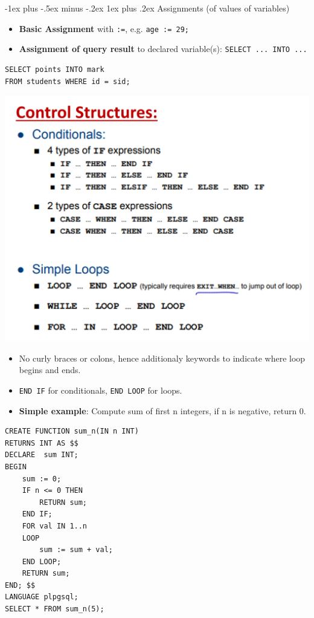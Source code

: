 \documentclass[12pt, landscape]{article}
\makeatletter
\newcommand{\code}[1]{\colorbox{gray!25!}{\lstinline|#1|}}
\renewcommand{\subsubsection}{\@startsection{subsubsection}{3}{0.1mm}%
                                {-1ex plus -.5ex minus -.2ex}%
                                {1ex plus .2ex}%
                                {\normalfont\small\bfseries}}
\makeatother
\begin{document}
\begin{multicols*}{3}
\subsubsection{Assignments (of values of variables)}
\begin{itemize}
\item \textbf{Basic Assignment} with \code{:=}, e.g. \code{age := 29;}
\item \textbf{Assignment of query result} to declared variable(s): \code{SELECT ... INTO ...}
\end{itemize}
\begin{lstlisting}
SELECT points INTO mark 
FROM students WHERE id = sid;
\end{lstlisting}

\centerline{\includegraphics[width=1 \linewidth]{controlstructures}}
\smallskip
\begin{itemize}
\item No curly braces or colons, hence additionaly keywords to indicate where loop begins and ends.
\item \code{END IF} for conditionals, \code{END LOOP} for loops.
\item \textbf{Simple example}: Compute sum of first n integers, if n is negative, return 0.
\end{itemize}

\begin{lstlisting}
CREATE FUNCTION sum_n(IN n INT)
RETURNS INT AS $$
DECLARE  sum INT;
BEGIN
    sum := 0;
    IF n <= 0 THEN 
        RETURN sum; 
    END IF;
    FOR val IN 1..n 
    LOOP
        sum := sum + val;
    END LOOP;
    RETURN sum;
END; $$
LANGUAGE plpgsql;
SELECT * FROM sum_n(5);
\end{lstlisting}


\end{multicols*}
\end{document}
